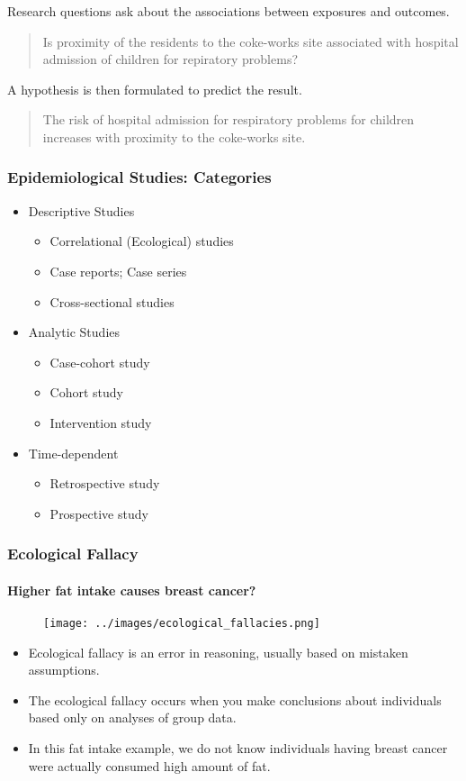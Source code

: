 \documentclass[table,10pt]{beamer}
\begin{document}
\begin{CJK*}{UTF8}{gbsn}
\begin{frame}
Research questions ask about the associations between exposures and outcomes. 
\begin{quote}
Is proximity of the residents to the coke-works site associated with hospital 
admission of children for repiratory problems?
\end{quote}

A hypothesis is then formulated to predict the result.
\begin{quote}
The risk of hospital admission for respiratory problems for children increases 
with proximity to the coke-works site.
\end{quote} 
\end{frame}


\begin{frame}[t]
\frametitle{Epidemiological Studies: Categories}
\begin{itemize}
	\item Descriptive Studies
	\begin{itemize}
		\item Correlational (Ecological) studies
		\item Case reports; Case series
		\item \alert{Cross-sectional studies}
	\end{itemize}
	\item Analytic Studies
	\begin{itemize}
		\item Case-cohort study
		\item Cohort study
		\item Intervention study
	\end{itemize}
	\item Time-dependent
	\begin{itemize}
		\item Retrospective study
		\item Prospective study
	\end{itemize}
\end{itemize}
\end{frame}


\begin{frame}[t]
\frametitle{Ecological Fallacy}
\framesubtitle{Higher fat intake causes breast cancer?}
\begin{figure}
\texttt{[image: ../images/ecological\_fallacies.png]}
\end{figure}
\begin{itemize}
	\item<1-> Ecological fallacy is an error in reasoning, usually based on 
		mistaken assumptions. 
	\item<2-> The ecological fallacy occurs when you \alert{make conclusions about 
		individuals based only on analyses of group data}. 
	\item<3-> In this fat intake example, we do not know individuals having 
		breast cancer were actually consumed high amount of fat.
\end{itemize}
\end{frame}


\end{CJK*}
\end{document}
